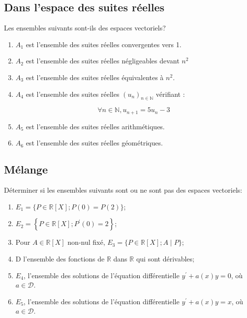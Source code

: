 \vspace{2em}

\subsection{Dans l'espace des suites réelles}

Les ensembles suivants sont-ils des espaces vectoriels?
\begin{enumerate}
  \item $A_1$ est l'ensemble des suites réelles convergentes vers 1.
  \item $A_2$ est l'ensemble des suites réelles négligeables devant $n^2$
  \item $A_3$ est l'ensemble des suites réelles équivalentes à $n^2$.
  \item $A_4$ est l'ensemble des suites réelles $\left(u_n\right)_{n \in \mathbb{N}}$ vérifiant :

$$
\forall n \in \mathbb{N}, u_{n+1}=5 u_n-3
$$

  \item $A_5$ est l'ensemble des suites réelles arithmétiques.
  \item $A_6$ est l'ensemble des suites réelles géométriques.
\end{enumerate}


  \vspace{2em}
    \subsection{Mélange}
    Déterminer si les ensembles suivants sont ou ne sont pas des espaces vectoriels:
    \begin{enumerate}
      \item $E_1=\{P \in \mathbb{R}[X] ; P(0)=P(2)\}$;
      \item $E_2=\left\{P \in \mathbb{R}[X] ; P^{\prime}(0)=2\right\}$;
      \item Pour $A \in \mathbb{R}[X]$ non-nul fixé, $E_3=\{P \in \mathbb{R}[X] ; A \mid P\}$;
      \item D l'ensemble des fonctions de $\mathbb{R}$ dans $\mathbb{R}$ qui sont dérivables;
      \item $E_4$, l'ensemble des solutions de l'équation différentielle $y^{\prime}+a(x) y=0$, où $a \in \mathcal{D}$.
      \item $E_5$, l'ensemble des solutions de l'équation différentielle $y^{\prime}+a(x) y=x$, où $a \in \mathcal{D}$.
    \end{enumerate}

